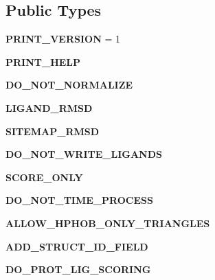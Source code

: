 \subsection*{Public Types}
\begin{CompactItemize}
\item 
\textbf{PRINT\_\-VERSION} = 1\label{classASCbase_1_1SearchParameters_0278737369e96b0ca8d7685578a160d523d6d6cc3c507f57dbfb27c66de5af61}

\item 
\textbf{PRINT\_\-HELP}\label{classASCbase_1_1SearchParameters_0278737369e96b0ca8d7685578a160d5946fe3b6fb33a3f1a1f1bfcb799e7f57}

\item 
\textbf{DO\_\-NOT\_\-NORMALIZE}\label{classASCbase_1_1SearchParameters_0278737369e96b0ca8d7685578a160d56d064d2864a74b09ebb91ade006be98b}

\item 
\textbf{LIGAND\_\-RMSD}\label{classASCbase_1_1SearchParameters_0278737369e96b0ca8d7685578a160d539c302e55fa4a62c9fc42ddaf0aecf79}

\item 
\textbf{SITEMAP\_\-RMSD}\label{classASCbase_1_1SearchParameters_0278737369e96b0ca8d7685578a160d5be2fcd7debcbc43f9246f2e96a55b061}

\item 
\textbf{DO\_\-NOT\_\-WRITE\_\-LIGANDS}\label{classASCbase_1_1SearchParameters_0278737369e96b0ca8d7685578a160d5842ee3990d6101fe149155fb635857f8}

\item 
\textbf{SCORE\_\-ONLY}\label{classASCbase_1_1SearchParameters_0278737369e96b0ca8d7685578a160d56cca043172e95be1ac3a62aa07b3e929}

\item 
\textbf{DO\_\-NOT\_\-TIME\_\-PROCESS}\label{classASCbase_1_1SearchParameters_0278737369e96b0ca8d7685578a160d5df4956ce18d7222d72380e017a2f08a0}

\item 
\textbf{ALLOW\_\-HPHOB\_\-ONLY\_\-TRIANGLES}\label{classASCbase_1_1SearchParameters_0278737369e96b0ca8d7685578a160d5ff8d9bfbd20c4d153faebdc41c3a6850}

\item 
\textbf{ADD\_\-STRUCT\_\-ID\_\-FIELD}\label{classASCbase_1_1SearchParameters_0278737369e96b0ca8d7685578a160d57ed6e1e5168b8f6cc426662e6d3dcff8}

\item 
\textbf{DO\_\-PROT\_\-LIG\_\-SCORING}\label{classASCbase_1_1SearchParameters_0278737369e96b0ca8d7685578a160d58f07579b71a52c91abe56ecb74b4ff36}


\end{CompactItemize}
